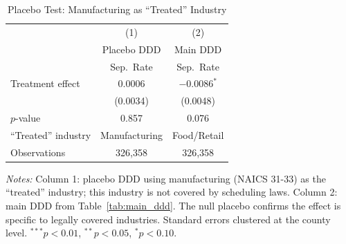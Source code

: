 \begin{table}[htbp]
\centering
\caption{Placebo Test: Manufacturing as ``Treated'' Industry}
\label{tab:placebo}
\begin{threeparttable}
\begin{tabular}{lcc}
\toprule
 & (1) & (2) \\
 & Placebo DDD & Main DDD \\
 & Sep.\ Rate & Sep.\ Rate \\
\midrule
Treatment effect & $0.0006$ & $-0.0086^{*}$ \\
 & (0.0034) & (0.0048) \\
$p$-value & 0.857 & 0.076 \\
\midrule
``Treated'' industry & Manufacturing & Food/Retail \\
Observations & 326,358 & 326,358 \\
\bottomrule
\end{tabular}
\begin{tablenotes}[flushleft]\small
\item \textit{Notes:} Column 1: placebo DDD using manufacturing (NAICS 31-33) as the ``treated'' industry; this industry is not covered by scheduling laws. Column 2: main DDD from Table~\ref{tab:main_ddd}. The null placebo confirms the effect is specific to legally covered industries. Standard errors clustered at the county level. $^{***}p<0.01$, $^{**}p<0.05$, $^{*}p<0.10$.
\end{tablenotes}
\end{threeparttable}
\end{table}
